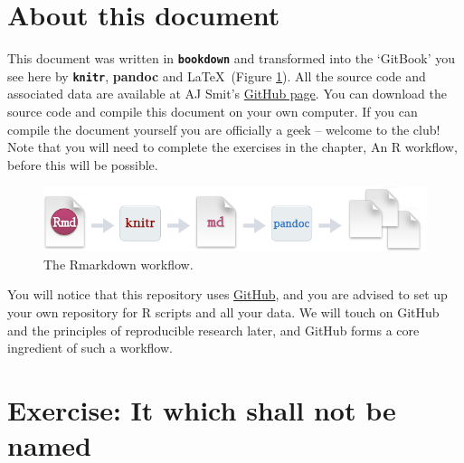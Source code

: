 \documentclass[
]{book}
\begin{document}
\hypertarget{about-this-document}{%
\section{About this document}\label{about-this-document}}

This document was written in \textbf{\texttt{bookdown}} and transformed into the `GitBook' you see here by \textbf{\texttt{knitr}}, \textbf{pandoc} and \LaTeX~(Figure \ref{fig:rmarkdown}). All the source code and associated data are available at AJ Smit's \href{https://github.com/ajsmit/Intro_R_Workshop}{GitHub page}. You can download the source code and compile this document on your own computer. If you can compile the document yourself you are officially a geek -- welcome to the club! Note that you will need to complete the exercises in the chapter, An R workflow, before this will be possible.

\begin{figure}

{\centering \includegraphics[width=1\linewidth]{figures/RMarkdownFlow} 

}

\caption{The Rmarkdown workflow.}\label{fig:rmarkdown}
\end{figure}

You will notice that this repository uses \href{https://github.com}{GitHub}, and you are advised to set up your own repository for R scripts and all your data. We will touch on GitHub and the principles of reproducible research later, and GitHub forms a core ingredient of such a workflow.

\hypertarget{exercise-it-which-shall-not-be-named}{%
\section{Exercise: It which shall not be named}\label{exercise-it-which-shall-not-be-named}}
\end{document}
